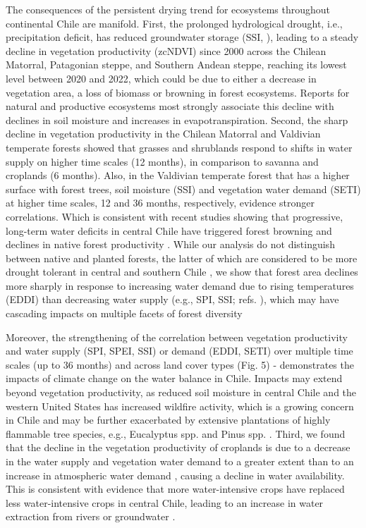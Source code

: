 \documentclass[
  sn-nature,
  numbered]{sn-jnl}
\begin{document}
The consequences of the persistent drying trend for ecosystems
throughout continental Chile are manifold. First, the prolonged
hydrological drought, i.e., precipitation deficit, has reduced
groundwater storage (SSI, \citep{Taucare2024}), leading to a steady
decline in vegetation productivity (zcNDVI) since 2000 across the
Chilean Matorral, Patagonian steppe, and Southern Andean steppe,
reaching its lowest level between 2020 and 2022, which could be due to
either a decrease in vegetation area, a loss of biomass or browning in
forest ecosystems. Reports for natural and productive ecosystems
\citep{Nicolai-Shaw2017, Jiang2020, Zhou2021} most strongly associate
this decline with declines in soil moisture and increases in
evapotranspiration. Second, the sharp decline in vegetation productivity
in the Chilean Matorral and Valdivian temperate forests showed that
grasses and shrublands respond to shifts in water supply on higher time
scales (12 months), in comparison to savanna and croplands (6 months).
Also, in the Valdivian temperate forest that has a higher surface with
forest trees, soil moisture (SSI) and vegetation water demand (SETI) at
higher time scales, 12 and 36 months, respectively, evidence stronger
correlations. Which is consistent with recent studies showing that
progressive, long-term water deficits in central Chile have triggered
forest browning and declines in native forest productivity
\citep[e.g.,][]{Miranda2023, Miranda2020, Venegas2022}. While our
analysis do not distinguish between native and planted forests, the
latter of which are considered to be more drought tolerant in central
and southern Chile \citep{Carrasco2022}, we show that forest area
declines more sharply in response to increasing water demand due to
rising temperatures (EDDI) than decreasing water supply (e.g., SPI, SSI;
refs. \citep{Fajardo2019, Holz2018}), which may have cascading impacts
on multiple facets of forest diversity \citep{Segovia2021, Sabatini2022}

Moreover, the strengthening of the correlation between vegetation
productivity and water supply (SPI, SPEI, SSI) or demand (EDDI, SETI)
over multiple time scales (up to 36 months) and across land cover types
(Fig. 5) - demonstrates the impacts of climate change on the water
balance in Chile. Impacts may extend beyond vegetation productivity, as
reduced soil moisture in central Chile and the western United States has
increased wildfire activity\citep{Holden2018, Gonzalez2018}, which is a
growing concern in Chile and may be further exacerbated by extensive
plantations of highly flammable tree species, e.g., Eucalyptus spp. and
Pinus spp. \citep{Bowman2019}. Third, we found that the decline in the
vegetation productivity of croplands is due to a decrease in the water
supply and vegetation water demand to a greater extent than to an
increase in atmospheric water demand \citep{Quiring2010}, causing a
decline in water availability. This is consistent with evidence that
more water-intensive crops have replaced less water-intensive crops in
central Chile, leading to an increase in water extraction from rivers or
groundwater \citep{Munoz2020, Duran2020}.
\end{document}
